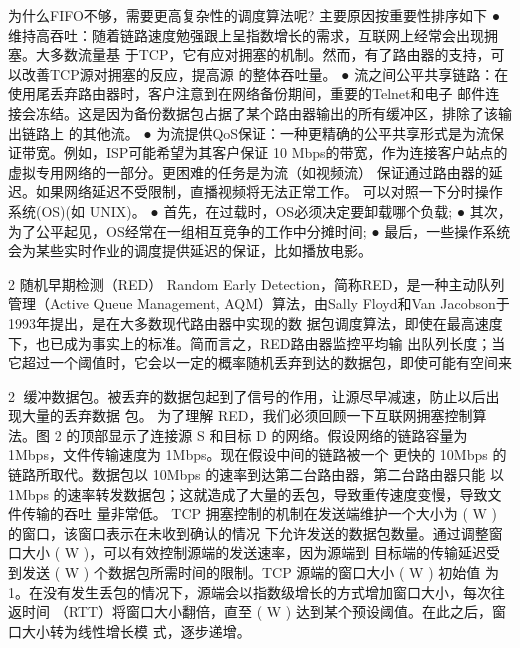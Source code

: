 为什么FIFO不够，需要更高复杂性的调度算法呢? 主要原因按重要性排序如下
 ● 维持高吞吐：随着链路速度勉强跟上呈指数增长的需求，互联网上经常会出现拥塞。大多数流量基
   于TCP，它有应对拥塞的机制。然而，有了路由器的支持，可以改善TCP源对拥塞的反应，提高源
   的整体吞吐量。
 ● 流之间公平共享链路：在使用尾丢弃路由器时，客户注意到在网络备份期间，重要的Telnet和电子
   邮件连接会冻结。这是因为备份数据包占据了某个路由器输出的所有缓冲区，排除了该输出链路上
   的其他流。
 ● 为流提供QoS保证：一种更精确的公平共享形式是为流保证带宽。例如，ISP可能希望为其客户保证
   10 Mbps的带宽，作为连接客户站点的虚拟专用网络的一部分。更困难的任务是为流（如视频流）
   保证通过路由器的延迟。如果网络延迟不受限制，直播视频将无法正常工作。
可以对照一下分时操作系统(OS)(如 UNIX)。
 ● 首先，在过载时，OS必须决定要卸载哪个负载;
 ● 其次，为了公平起见，OS经常在一组相互竞争的工作中分摊时间;
 ● 最后，一些操作系统会为某些实时作业的调度提供延迟的保证，比如播放电影。



2 随机早期检测（RED）
  Random Early Detection，简称RED，是一种主动队列管理（Active Queue Management,
AQM）算法，由Sally Floyd和Van Jacobson于1993年提出，是在大多数现代路由器中实现的数
据包调度算法，即使在最高速度下，也已成为事实上的标准。简而言之，RED路由器监控平均输
出队列长度；当它超过一个阈值时，它会以一定的概率随机丢弃到达的数据包，即使可能有空间来

                                                                2
缓冲数据包。被丢弃的数据包起到了信号的作用，让源尽早减速，防止以后出现大量的丢弃数据
包。
  为了理解 RED，我们必须回顾一下互联网拥塞控制算法。图 2 的顶部显示了连接源 S 和目标
D 的网络。假设网络的链路容量为 1Mbps，文件传输速度为 1Mbps。现在假设中间的链路被一个
更快的 10Mbps 的链路所取代。数据包以 10Mbps 的速率到达第二台路由器，第二台路由器只能
以 1Mbps 的速率转发数据包；这就造成了大量的丢包，导致重传速度变慢，导致文件传输的吞吐
量非常低。
  TCP 拥塞控制的机制在发送端维护一个大小为 ( W ) 的窗口，该窗口表示在未收到确认的情况
下允许发送的数据包数量。通过调整窗口大小 ( W )，可以有效控制源端的发送速率，因为源端到
目标端的传输延迟受到发送 ( W ) 个数据包所需时间的限制。TCP 源端的窗口大小 ( W ) 初始值
为 1。在没有发生丢包的情况下，源端会以指数级增长的方式增加窗口大小，每次往返时间
（RTT）将窗口大小翻倍，直至 ( W ) 达到某个预设阈值。在此之后，窗口大小转为线性增长模
式，逐步递增。




